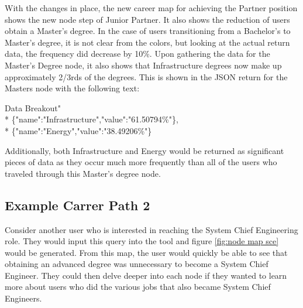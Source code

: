 With the changes in place, the new career map for achieving the Partner
position shows the new node step of Junior Partner.  It also shows the reduction
of users obtain a Master's degree.  In the case of users transitioning from a
Bachelor's to Master's degree, it is not clear from the colors, but looking at
the actual return data, the frequency did decrease by 10\%.  Upon gathering the
data for the Master's Degree node, it also shows that Infrastructure degrees now
make up approximately 2/3rds of the degrees.  This is shown in the JSON
return for the Masters node with the following text:

\indent Data Breakout"\\*
\indent \indent \indent \{"name":"Infrastructure","value":"61.50794\%"\},\\*
\indent \indent \indent \{"name":"Energy","value":"38.49206\%"\}

\noindent Additionally, both Infrastructure and Energy would be returned as
significant pieces of data as they occur much more frequently than all of the
users who traveled through this Master's degree node.

\subsection{Example Carrer Path 2 }
Consider another user who is interested in reaching the System Chief Engineering
role.  They would input this query into the tool and figure \ref{fig:node map
sce} would be generated.  From this map, the user would quickly be able to see
that obtaining an advanced degree was unnecessary to become a System Chief
Engineer.  They could then delve deeper into each node if they wanted to learn
more about users who did the various jobs that also became System Chief
Engineers.


\usetikzlibrary{shapes,arrows,chains}

